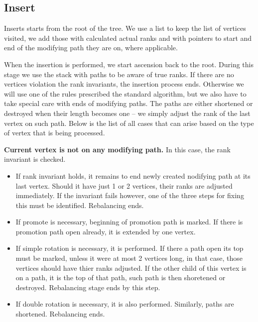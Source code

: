 \subsection{Insert}

Inserts starts from the root of the tree. We use a list to keep the list of vertices visited, we add those with calculated actual ranks and with pointers to start and end of the modifying path they are on, where applicable.



When the insertion is performed, we start ascension back to the root. During this stage we use the stack with paths to be aware of true ranks. If there are no vertices violation the rank invariants, the insertion process ends. Otherwise we will use one of the rules prescribed the standard algorithm, but we also have to take special care with ends of modifying paths. The paths are either shortened or destroyed when their length becomes one -- we simply adjust the rank of the last vertex on such path. Below is the list of all cases that can arise based on the type of vertex that is being processed.

\textbf{Current vertex is not on any modifying path.} In this case, the rank invariant is checked. 

\begin{itemize}

\item If rank invariant holds, it remains to end newly created nodifying path at its last vertex. Should it have just 1 or 2 vertices, their ranks are adjusted immediately. If the invariant fails however, one of the three steps for fixing this must be identified. Rebalancing ends.

\item If promote is necessary, beginning of promotion path is marked. If there is promotion path open already, it is extended by one vertex.

\item If simple rotation is necessary, it is performed. If there a path open its top must be marked, unless it were at most 2 vertices long, in that case, those vertices should have thier ranks adjusted. If the other child of this vertex is on a path, it is the top of that path, such path is then shoretened or destroyed. Rebalancing stage ends by this step.

\item If double rotation is necessary, it is also performed. Similarly, paths are shortened. Rebalancing ends.

\end{itemize}

